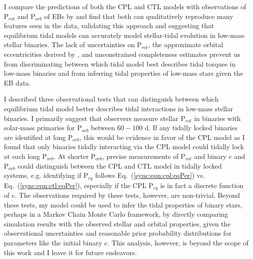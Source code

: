 I compare the predictions of both the CPL and CTL models with observations of P$_{rot}$ and P$_{orb}$ of \kepler EBs by \citet{Lurie2017} and find that both can qualitatively reproduce many features seen in the data, validating this approach and suggesting that equilibrium tidal models can accurately model stellar-tidal evolution in low-mass stellar binaries. The lack of uncertainties on P$_{rot}$, the approximate orbital eccentricities derived by \citet{Lurie2017}, and unconstrained completeness estimates prevent us from discriminating between which tidal model best describes tidal torques in low-mass binaries and from inferring tidal properties of low-mass stars given the \kepler EB data.  

I described three observational tests that can distinguish between which equilibrium tidal model better describes tidal interactions in low-mass stellar binaries. I primarily suggest that observers measure stellar P$_{rot}$ in binaries with solar-mass primaries for P$_{orb}$ between $60-100$ d. If any tidally locked binaries are identified at long P$_{orb}$, this would be evidence in favor of the CPL model as I found that only binaries tidally interacting via the CPL model could tidally lock at such long P$_{orb}$. At shorter P$_{orb}$, precise measurements of P$_{rot}$ and binary $e$ and P$_{orb}$ could distinguish between the CPL and CTL model in tidally locked systems, e.g. identifying if P$_{eq}$ follows Eq.~(\ref{sync:eqn:cpl:eqPer}) vs. Eq.~(\ref{sync:eqn:ctl:eqPer}), especially if the CPL P$_{eq}$ is in fact a discrete function of $e$. The observations required by these tests, however, are non-trivial. Beyond these tests, my model could be used to infer the tidal properties of binary stars, perhaps in a Markov Chain Monte Carlo framework, by directly comparing simulation results with the observed stellar and orbital properties, given the observational uncertainties and reasonable prior probability distributions for parameters like the initial binary $e$. This analysis, however, is beyond the scope of this work and I leave it for future endeavors.

